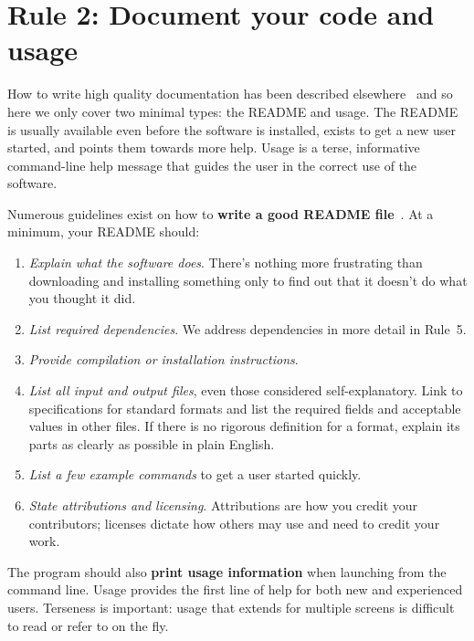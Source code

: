 \documentclass[10pt,letterpaper]{article}
\newcommand{\rulemajor}[1]{\section*{#1}}
\newcommand{\ruleminor}[1]{\textbf{#1}}
\begin{document}
\rulemajor{Rule 2: Document your code and usage}

How to write high quality documentation has been described
elsewhere~\cite{karimzadeh2016} and so here we only cover two minimal
types: the README and usage.  The README is usually available even
before the software is installed, exists to get a new user started,
and points them towards more help. Usage is a terse, informative
command-line help message that guides the user in the correct use of
the software.

Numerous guidelines exist on how to \ruleminor{write a good README
file}~\cite{Johnson1997,gnustandards}.  At a minimum, your README
should:

\begin{enumerate}

\item
  \textit{Explain what the software does}.  There's nothing more
  frustrating than downloading and installing something only to find
  out that it doesn't do what you thought it did.

\item
  \textit{List required dependencies}.  We address dependencies in
  more detail in Rule~5.

\item
  \textit{Provide compilation or installation instructions}.

\item
  \textit{List all input and output files}, even those considered
  self-explanatory.  Link to specifications for standard formats and
  list the required fields and acceptable values in other files.  If
  there is no rigorous definition for a format, explain its parts as
  clearly as possible in plain English.

\item
  \textit{List a few example commands} to get a user started quickly.

\item
  \textit{State attributions and licensing}. Attributions are how you
  credit your contributors; licenses dictate how others may use and
  need to credit your work.

\end{enumerate}

The program should also \ruleminor{print usage information} when
launching from the command line.  Usage provides the first line of
help for both new and experienced users.  Terseness is important:
usage that extends for multiple screens is difficult to read or refer
to on the fly.
\end{document}

